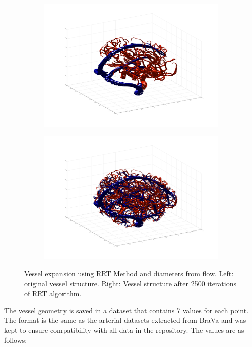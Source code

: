 \documentclass[11pt,english,a4paper,twoside,openright]{report}
\begin{document}
{{{{{{{{\begin{figure}[h]
	\centering
	\begin{subfigure}[b]{0.45\textwidth}
		\includegraphics[width=\textwidth]{Chapter3/Chapter3Vessels1}
	\end{subfigure}
	\begin{subfigure}[b]{0.45\textwidth}
		\includegraphics[width=\textwidth]{Chapter3/Chapter3Vessels2}
	\end{subfigure}
	\caption[Vessel expansion using RRT Method and diameters from flow]{Vessel expansion using RRT Method and diameters from flow. Left: original vessel structure. Right: Vessel structure after 2500 iterations of RRT algorithm.}
	\label{fig:RRTfull}
\end{figure}

The vessel geometry is saved in a dataset that contains 7 values for each point. The format is the same as the arterial datasets extracted from BraVa \cite{wright2013digital} and was kept to ensure compatibility with all data in the repository. The values are as follows:

}}}}}}}}
\end{document}
